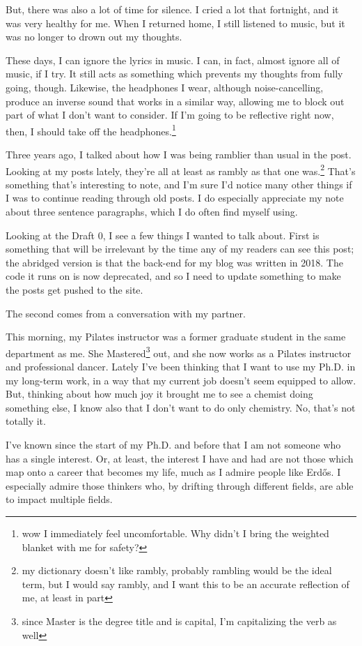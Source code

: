 \documentclass[12pt]{article}
\renewcommand{\,}{\textsuperscript{,}}
\begin{document}
But, there was also a lot of time for silence.  
I cried a lot that fortnight, and it was very healthy for me.  
When I returned home, I still listened to music, but it was no longer to drown out my thoughts.

These days, I can ignore the lyrics in music.  
I can, in fact, almost ignore all of music, if I try.  
It still acts as something which prevents my thoughts from fully going, though.  
Likewise, the headphones I wear, although noise-cancelling, produce an inverse sound that works in a similar way, allowing me to block out part of what I don't want to consider.  
If I'm going to be reflective right now, then, I should take off the headphones.\footnote{wow I immediately feel uncomfortable. Why didn't I bring the weighted blanket with me for safety?}

Three years ago, I talked about how I was being ramblier than usual in the post.  
Looking at my posts lately, they're all at least as rambly as that one was.\footnote{my dictionary doesn't like rambly, probably rambling would be the ideal term, but I would say rambly, and I want this to be an accurate reflection of me, at least in part}  
That's something that's interesting to note, and I'm sure I'd notice many other things if I was to continue reading through old posts.  
I do especially appreciate my note about three sentence paragraphs, which I do often find myself using.

Looking at the Draft 0, I see a few things I wanted to talk about.  
First is something that will be irrelevant by the time any of my readers can see this post; the abridged version is that the back-end for my blog was written in 2018.  
The code it runs on is now deprecated, and so I need to update something to make the posts get pushed to the site.

The second comes from a conversation with my partner.

This morning, my Pilates instructor was a former graduate student in the same department as me.  
She Mastered\footnote{since Master is the degree title and is capital, I'm capitalizing the verb as well} out, and she now works as a Pilates instructor and professional dancer.  
Lately I've been thinking that I want to use my Ph.D. in my long-term work, in a way that my current job doesn't seem equipped to allow.  
But, thinking about how much joy it brought me to see a chemist doing something else, I know also that I don't want to do only chemistry.  
No, that's not totally it.

I've known since the start of my Ph.D. and before that I am not someone who has a single interest.  
Or, at least, the interest I have and had are not those which map onto a career that becomes my life, much as I admire people like Erd{\H o}s.  
I especially admire those thinkers who, by drifting through different fields, are able to impact multiple fields.
\end{document}
